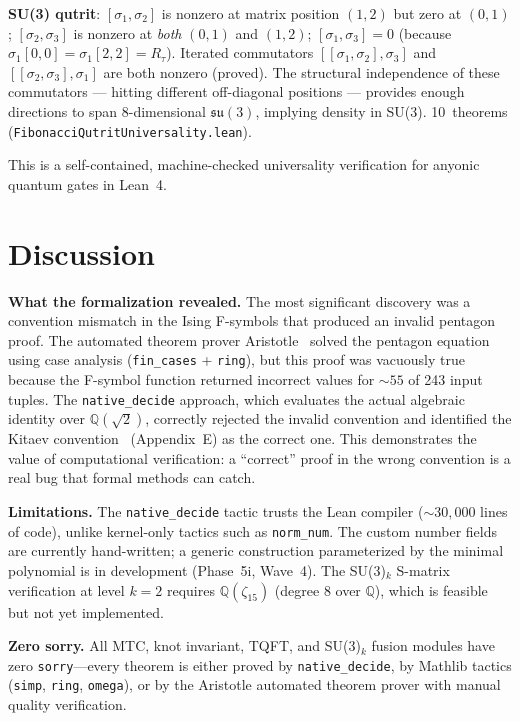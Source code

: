 \documentclass[12pt]{article}
\newcommand{\lean}[1]{\texttt{#1}}
\newcommand{\sorry}{\texttt{sorry}}
\newcommand{\nativedecide}{\texttt{native\_decide}}
\begin{document}
\textbf{SU(3) qutrit}: $[\sigma_1, \sigma_2]$ is nonzero at matrix
position $(1,2)$ but zero at $(0,1)$; $[\sigma_2, \sigma_3]$ is
nonzero at \emph{both} $(0,1)$ and $(1,2)$; $[\sigma_1, \sigma_3] = 0$
(because $\sigma_1[0,0] = \sigma_1[2,2] = R_\tau$).  Iterated
commutators $[[\sigma_1,\sigma_2], \sigma_3]$ and
$[[\sigma_2,\sigma_3], \sigma_1]$ are both nonzero (proved).
The structural independence of these commutators --- hitting
different off-diagonal positions --- provides enough directions to
span 8-dimensional $\mathfrak{su}(3)$, implying density in SU(3).
10~theorems (\lean{FibonacciQutritUniversality.lean}).

This is a self-contained, machine-checked universality verification for
anyonic quantum gates in Lean~4.

\section{Discussion}
\label{sec:discussion}

\textbf{What the formalization revealed.} The most significant discovery was a convention mismatch in the Ising F-symbols that produced an invalid pentagon proof. The automated theorem prover Aristotle~\cite{aristotle} solved the pentagon equation using case analysis (\lean{fin\_cases} + \lean{ring}), but this proof was vacuously true because the F-symbol function returned incorrect values for ${\sim}55$ of 243 input tuples. The \nativedecide{} approach, which evaluates the actual algebraic identity over $\mathbb{Q}(\sqrt{2})$, correctly rejected the invalid convention and identified the Kitaev convention~\cite{kitaev2006} (Appendix~E) as the correct one. This demonstrates the value of computational verification: a ``correct'' proof in the wrong convention is a real bug that formal methods can catch.

\textbf{Limitations.} The \nativedecide{} tactic trusts the Lean compiler (${\sim}30{,}000$ lines of code), unlike kernel-only tactics such as \lean{norm\_num}. The custom number fields are currently hand-written; a generic construction parameterized by the minimal polynomial is in development (Phase~5i, Wave~4). The SU(3)$_k$ S-matrix verification at level $k=2$ requires $\mathbb{Q}(\zeta_{15})$ (degree 8 over $\mathbb{Q}$), which is feasible but not yet implemented.

\textbf{Zero sorry.} All MTC, knot invariant, TQFT, and SU(3)$_k$ fusion modules have zero \sorry{}---every theorem is either proved by \nativedecide{}, by Mathlib tactics (\lean{simp}, \lean{ring}, \lean{omega}), or by the Aristotle automated theorem prover with manual quality verification.
\end{document}
